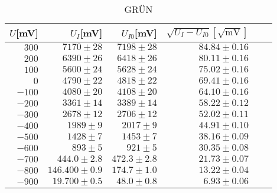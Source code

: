 \begin{table}[h!]
  \centering
  \caption{GRÜN}
    \begin{tabular}{r r r r r r}
        \toprule
    $U$[mV] & $U_I$[mV] & $U_{I0}$[mV] & $\sqrt{U_I  - U_{I0}}[\sqrt{\text{mV}}]$\\
    \midrule
    $300$&$7170 \pm 28$ & $7198 \pm 28$ & $84.84 \pm 0.16$ \\
    $200$&$6390 \pm 26$ & $6418 \pm 26$ & $80.11 \pm 0.16$ \\
    $100$&$5600\pm 24 $   &$ 5628 \pm 24$ & $75.02 \pm 0.16$ \\
    $0$&$4790 \pm 22$ & $4818\pm 22$ & $69.41\pm 0.16 $\\
    $-100$&$4080 \pm 20 $ & $4108 \pm 20$ & $64.10 \pm 0.16 $\\
    $-200$&$3361  \pm 14$ & $3389 \pm 14$ & $58.22 \pm 0.12$ \\
    $-300$&$2678 \pm 12$ & $2706 \pm 12$ & $52.02 \pm 0.11 $\\
    $-400$&$1989 \pm 9 $& $2017 \pm 9$ & $44.91\pm 0.10$ \\
    $-500$&$1428 \pm 7$ & $1453 \pm 7$ & $38.16 \pm 0.09$ \\
    $-600$&$893 \pm 5$ & $921 \pm 5$ & $30.35 \pm 0.08$ \\
    $-700$&$444.0 \pm 2.8$ & $472.3 \pm 2.8$ & $21.73 \pm 0.07$ \\
    $-800$&$146.400 \pm 0.9$ & $174.7 \pm 1.0$ & $13.22 \pm 0.04$ \\
    $-900$&$19.700 \pm 0.5$ & $48.0    \pm 0.8 $& $6.93 \pm 0.06 $\\
    \end{tabular}%
  \label{tab:addlabel}%
\end{table}%

